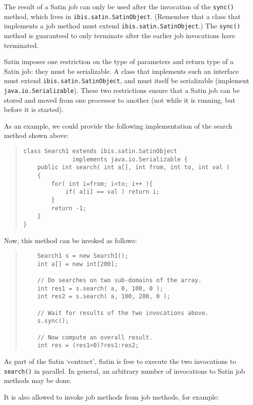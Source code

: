 \documentclass[10pt]{article}
\begin{document}
The result of a Satin job can only be used after the invocation
of the \verb+sync()+ method, which lives in \verb+ibis.satin.SatinObject+.
(Remember that a class that implements a job method must extend
\verb+ibis.satin.SatinObject+.) The \verb+sync()+
method is guaranteed to only terminate after the earlier job
invocations have terminated.

Satin imposes one restriction on the type of parameters and return type
of a Satin job: they must be serializable.
A class that implements such an interface must extend
\verb+ibis.satin.SatinObject+, and must itself be serializable
(implement \verb+java.io.Serializable+).
These two restrictions ensure that a Satin job can be stored and
moved from one processor to another (not while it is running, but before
it is started).

As an example, we could provide the following implementation of the
search method shown above:

\begin{quote}
\begin{verbatim}
class Search1 extends ibis.satin.SatinObject
              implements java.io.Serializable {
    public int search( int a[], int from, int to, int val )
    {
        for( int i=from; i<to; i++ ){
            if( a[i] == val ) return i;
        }
        return -1;
    }
}
\end{verbatim}
\end{quote}

Now, this method can be invoked as follows:

\begin{quote}
\begin{verbatim}
    Search1 s = new Search1();
    int a[] = new int[200];

    // Do searches on two sub-domains of the array.
    int res1 = s.search( a, 0, 100, 0 );
    int res2 = s.search( a, 100, 200, 0 );

    // Wait for results of the two invocations above.
    s.sync();

    // Now compute an overall result.
    int res = (res1>0)?res1:res2;
\end{verbatim}
\end{quote}

As part of the Satin `contract', Satin is free to execute the two
invocations to \verb+search()+ in parallel.
In general, an arbitrary number of
invocations to Satin job methods may be done.

It is also allowed to invoke job methods from job methods, for example:
\end{document}
